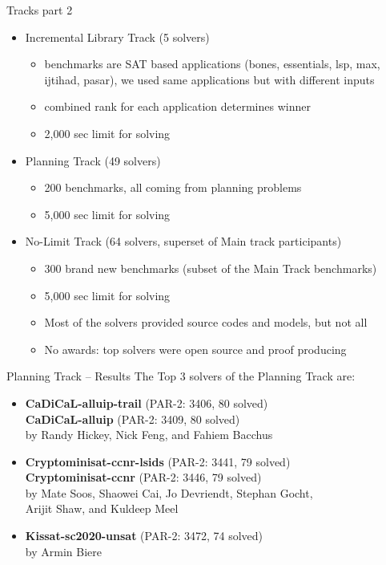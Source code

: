 \documentclass{beamer}
\begin{document}
\begin{frame}{Tracks part 2}
\begin{itemize}
\item Incremental Library Track (5 solvers)
\begin{itemize}
\item benchmarks are SAT based applications (bones, essentials, lsp, max, ijtihad, pasar), we used same applications but with different inputs
\item combined rank for each application determines winner
\item 2,000 sec limit for solving
\end{itemize}
\pause
\medskip
\item Planning Track (49 solvers)
\begin{itemize}
\item 200 benchmarks, all coming from planning problems
\item 5,000 sec limit for solving
\end{itemize}
\pause
\medskip
\item No-Limit Track (64 solvers, superset of Main track participants)
\begin{itemize}
\item 300 brand new benchmarks (subset of the Main Track benchmarks)
\item 5,000 sec limit for solving
\item Most of the solvers provided source codes and models, but not all
\item No awards: top solvers were open source and proof producing
\end{itemize}
\end{itemize}
\end{frame}


\begin{frame}{Planning Track -- Results}
The Top 3 solvers of the Planning Track are:
\begin{itemize}
\item[1]<4->{\bf CaDiCaL-alluip-trail} (PAR-2: 3406, 80 solved)\\
{\bf CaDiCaL-alluip} (PAR-2: 3409, 80 solved)\\
by Randy Hickey, Nick Feng, and Fahiem Bacchus
\item[2]<3-> {\bf Cryptominisat-ccnr-lsids} (PAR-2: 3441, 79 solved)\\
{\bf Cryptominisat-ccnr} (PAR-2: 3446, 79 solved)\\
by Mate Soos, Shaowei Cai, Jo Devriendt, Stephan Gocht,\\Arijit Shaw, and  Kuldeep Meel
\item[3]<2-> {\bf Kissat-sc2020-unsat} (PAR-2: 3472, 74 solved)\\
by Armin Biere
\end{itemize}

\bigskip


\end{frame}
\end{document}
